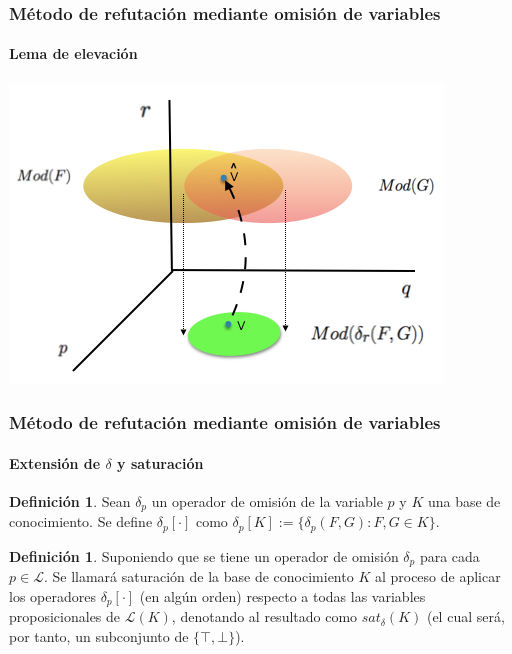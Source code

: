 \documentclass[12pt,a4paper]{beamer}
\theoremstyle{definition}
\newtheorem{defn}[thm]{Definición}
\theoremstyle{remark}
\begin{document}
\begin{frame}
\frametitle{\normalsize{Método de refutación mediante omisión de variables}}
\framesubtitle{Lema de elevación}
\begin{center}
\includegraphics[scale=0.6]{imagenes/indemod.png}
\end{center}
\end{frame}

\begin{frame}
\frametitle{\normalsize{Método de refutación mediante omisión de variables}}
\framesubtitle{Extensión de $\delta$ y saturación}
\begin{defn}
Sean $\delta_p$ un operador de omisión de la variable $p$ y $K$ una base de conocimiento. Se define $\delta_p [\cdot ]$ como $\delta_p [K] := \{ \delta_p (F,G) : F,G \in K \}$.
\end{defn}
\begin{defn}
Suponiendo que se tiene un operador de omisión $\delta_p$ para cada $p\in \mathcal{L}$. Se llamará \alert{saturación} de la base de conocimiento $K$ al proceso de aplicar los operadores $\delta_p [\cdot ]$ (en algún orden) respecto a todas las variables proposicionales de $\mathcal{L}(K)$, denotando al resultado como $sat_{\delta}(K)$ (el cual será, por tanto, un subconjunto de $\{ \top , \bot \}$).
\end{defn}
\end{frame}
\end{document}
